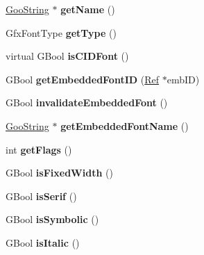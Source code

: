 \begin{DoxyCompactItemize}
\item 
\mbox{\label{class_gfx_font_a0b22be7a15d6ba5b8ac048c26f923a3f}} 
\hyperlink{class_goo_string}{Goo\+String} $\ast$ {\bfseries get\+Name} ()
\item 
\mbox{\label{class_gfx_font_ad96b2bb20628c5c25af15c15a16a36f9}} 
Gfx\+Font\+Type {\bfseries get\+Type} ()
\item 
\mbox{\label{class_gfx_font_ac12060de82fe59ce4eaa19f9364cf6bb}} 
virtual G\+Bool {\bfseries is\+C\+I\+D\+Font} ()
\item 
\mbox{\label{class_gfx_font_a0d0ba029507720172f98a0032fa041fa}} 
G\+Bool {\bfseries get\+Embedded\+Font\+ID} (\hyperlink{struct_ref}{Ref} $\ast$emb\+ID)
\item 
\mbox{\label{class_gfx_font_a3f3a2bc0c0c5d5bb73d5c18c9b9b5947}} 
G\+Bool {\bfseries invalidate\+Embedded\+Font} ()
\item 
\mbox{\label{class_gfx_font_ae539204d919e87a69155fd0a0c56f67f}} 
\hyperlink{class_goo_string}{Goo\+String} $\ast$ {\bfseries get\+Embedded\+Font\+Name} ()
\item 
\mbox{\label{class_gfx_font_a5e335868f0dd294ebc4c26e3d50c6e3e}} 
int {\bfseries get\+Flags} ()
\item 
\mbox{\label{class_gfx_font_a10a2a6ee32b4eb1f11cb4ac779771a8f}} 
G\+Bool {\bfseries is\+Fixed\+Width} ()
\item 
\mbox{\label{class_gfx_font_a5fec8c825629ab228fb311962240cc85}} 
G\+Bool {\bfseries is\+Serif} ()
\item 
\mbox{\label{class_gfx_font_ac10733178a3a8cf8ea930723b5a607e2}} 
G\+Bool {\bfseries is\+Symbolic} ()
\item 
\mbox{\label{class_gfx_font_a89a283551a45b423c4c58a50cf69c747}} 
G\+Bool {\bfseries is\+Italic} ()
\item 
\mbox{\label{class_gfx_font_a1b26af92c36a410b2e31d54ff46df977}} 

\end{DoxyCompactItemize}
